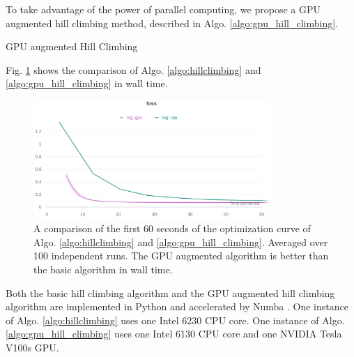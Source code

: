 To take advantage of the power of parallel computing, we propose a GPU augmented hill climbing method, described in Algo. \ref{algo:gpu_hill_climbing}.

\begin{algorithm}
    \caption{GPU augmented Hill Climbing}\label{algo:gpu_hill_climbing}
\end{algorithm}

Fig. \ref{fig:gpu_hill_climbing} shows the comparison of Algo. \ref{algo:hillclimbing} and \ref{algo:gpu_hill_climbing} in wall time.

\begin{figure}
    \centering
    \includegraphics[width=0.8\textwidth]{images/curve_60s.png}
    \caption{A comparison of the first 60 seconds of the optimization curve of Algo. \ref{algo:hillclimbing} and \ref{algo:gpu_hill_climbing}. 
    Averaged over 100 independent runs.
    The GPU augmented algorithm is better than the basic algorithm in wall time.
    }
    \label{fig:gpu_hill_climbing}
\end{figure}

Both the basic hill climbing algorithm and the GPU augmented hill climbing algorithm are implemented in Python and accelerated by Numba \cite{lam_numba_2015}.
One instance of Algo. \ref{algo:hillclimbing} uses one Intel 6230 CPU core.
One instance of Algo. \ref{algo:gpu_hill_climbing} uses one Intel 6130 CPU core and one NVIDIA Tesla V100s GPU.

